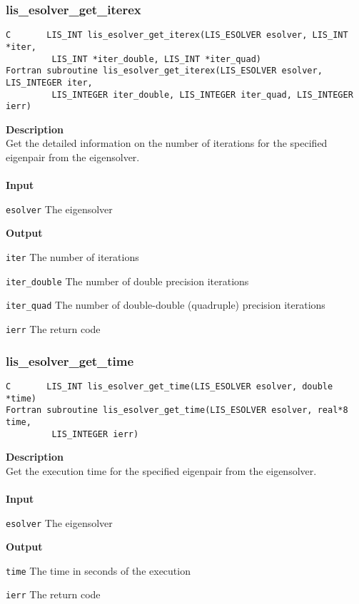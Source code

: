 \documentclass[a4paper]{article}
\newcommand{\namelistlabel}[1]{\mbox{#1}\hfill}
\newenvironment{namelist}[1]{%
\begin{list}{}
  {\let\makelabel\namelistlabel
  \settowidth{\labelwidth}{#1}
  \setlength{\leftmargin}{1.1\labelwidth}}
  }{%
\end{list}}
\begin{document}
\newpage
\subsubsection{lis\_esolver\_get\_iterex}
\begin{screen}
\verb|C       LIS_INT lis_esolver_get_iterex(LIS_ESOLVER esolver, LIS_INT *iter,|\\
\verb|         LIS_INT *iter_double, LIS_INT *iter_quad)|\\
\verb|Fortran subroutine lis_esolver_get_iterex(LIS_ESOLVER esolver, LIS_INTEGER iter,|\\
\verb|         LIS_INTEGER iter_double, LIS_INTEGER iter_quad, LIS_INTEGER ierr)|
\end{screen}
{\bf Description}\\
\indent
Get the detailed information on the number of iterations for the specified eigenpair from the eigensolver.
\\ \\
\noindent
{\bf Input}
\begin{namelist}{XXXXXXXXXXXXXXXXXXXX}
\item[\tt esolver] The eigensolver
\end{namelist}
{\bf Output}
\begin{namelist}{XXXXXXXXXXXXXXXXXXXX}
\item[\tt iter] The number of iterations
\item[\tt iter\_double] The number of double precision iterations
\item[\tt iter\_quad] The number of double-double (quadruple) precision iterations
\item[\tt ierr] The return code
\end{namelist}

\subsubsection{lis\_esolver\_get\_time}
\begin{screen}
\verb|C       LIS_INT lis_esolver_get_time(LIS_ESOLVER esolver, double *time)|\\
\verb|Fortran subroutine lis_esolver_get_time(LIS_ESOLVER esolver, real*8 time,|\\
\verb|         LIS_INTEGER ierr)|
\end{screen}
{\bf Description}\\
\indent
Get the execution time for the specified eigenpair from the eigensolver.
\\ \\
\noindent
{\bf Input}
\begin{namelist}{XXXXXXXXXXXXXXXXXXXX}
\item[\tt esolver] The eigensolver
\end{namelist}
{\bf Output}
\begin{namelist}{XXXXXXXXXXXXXXXXXXXX}
\item[\tt time] The time in seconds of the execution
\item[\tt ierr] The return code
\end{namelist}
\end{document}
